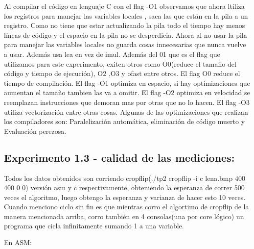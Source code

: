 \documentclass[a4paper]{article}
\begin{document}
Al compilar el código en lenguaje C con el flag -O1 observamos que ahora ltiliza los registros para manejar las variables locales , saca las que están en la pila a un registro. 
Como no tiene que estar actualizando la pila todo el tiempo hay menos líneas de código y el espacio en la pila no se desperdicia. 
Ahora al no usar la pila para manejar las variables locales no guarda cosas innecesarias que nunca vuelve a usar.\newline
Además usa lea en vez de imul.\newline
Además del 01 que es el flag que utilizamos para este experimento, exiten otros como O0(reduce el tamaño del código y tiempo de ejecución), O2 ,O3 y ofast entre otros.\newline
El flag O0 reduce el tiempo de compilación.
El flag -O1 optimiza en espacio, si hay optimizaciones que aumentan el tamaño tambien las va a omitir.\newline
El flag -O2 optimiza en velocidad se reemplazan instrucciones que demoran mas por otras que no lo hacen.\newline
El flag -O3 utiliza vectorización entre otras cosas. \newline
Algunas de las optimizaciones que realizan los compiladores son: Paralelización automática, eliminación de código muerto y Evaluación perezosa.


\newpage
\subsection{Experimento 1.3 - calidad de las mediciones:}
Todos los datos obtenidos son corriendo cropflip(./tp2 cropflip -i c lena.bmp 400 400 0 0) versión asm y c respectivamente, obteniendo la esperanza de correr 500 veces el algoritmo, luego obtengo la esperanza y varianza de hacer esto 10 veces.
\newline
Cuando menciono ciclo sin fin es que mientras corro el algortimo de cropflip de la manera mencionada arriba, corro también en 4 consolas(una por core lógico) un programa que cicla infinitamente sumando 1 a una variable.
\newline

En ASM: 
\newline
\end{document}
